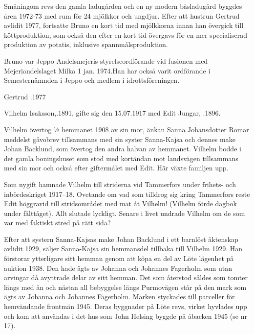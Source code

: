 Småningom revs den gamla ladugården och en ny modern båsladugård byggdes åren 1972-73 med rum för 24 mjölkkor och ungdjur. Efter att hustrun Gertrud avlidit 1977, fortsatte Bruno en kort tid med mjölkkorna innan han övergick till köttproduktion, som också den efter en kort tid övergavs för en mer specialiserad produktion av potatis, inklusive spannmålsproduktion.

Bruno var Jeppo Andelsmejeris styrelseordförande vid fusionen med Mejeriandelslaget Milka 1 jan. 1974.Han har också varit ordförande i Semesternämnden i Jeppo och medlem i idrottsföreningen.

Gertrud .1977





Vilhelm Isaksson,.1891, gifte sig den 15.07.1917 med Edit Jungar, .1896.

Vilhelm  övertog  ½ hemmanet 1908 av sin mor, änkan Sanna Johansdotter Romar meddelst gåvobrev tillsammans med sin syster Sanna-Kajsa och dennes make Johan Backlund, som övertog den andra halvan av hemmanet. Vilhelm bodde i det  gamla boningshuset som stod med kortändan mot landsvägen tillsammans med sin mor och också efter giftermålet med Edit. Här växte familjen upp.

Som nygift hamnade Vilhelm till striderna vid Tammerfors under frihets- och inbördeskriget 1917--18. Ovetande om vad som tilldrog sig kring Tammerfors reste Edit höggravid till stridsområdet med mat åt Vilhelm! (Vilhelm förde dagbok under fälttåget). Allt slutade lyckligt. Senare i livet undrade Vilhelm om de som var med faktiskt stred på rätt sida?

Efter att systern Sanna-Kajsas make Johan Backlund i ett barnlöst äktenskap avlidit 1929, säljer Sanna-Kajsa sin hemmansdel tillbaka till Vilhelm 1929. Han förstorar ytterligare sitt hemman genom att köpa en del av Löte lägenhet på auktion 1938. Den hade ägts av Johanna och Johannes Fagerholm som utan arvingar då  avyttrade  delar av sitt hemman. Det som återstod såldes som tomter längs med ån och nästan all bebyggelse längs Purmovägen står på den mark som ägts av Johanna och Johannes Fagerholm. Marken styckades till parceller för hemvändande frontmän 1945. Deras byggnader på Löte revs, virket hyvlades upp och kom att användas i det hus som John Helsing byggde på åbacken 1945 (se nr 17).


